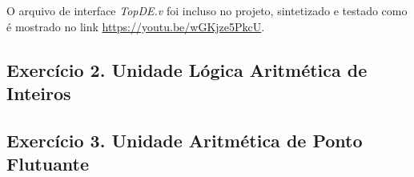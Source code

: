 \documentclass[12pt]{article}
\begin{document}
O arquivo de interface \textit{TopDE.v} foi incluso no projeto, sintetizado e testado como é mostrado no link \url{https://youtu.be/wGKjze5PkcU}.

\subsection{Exercício 2. Unidade Lógica Aritmética de Inteiros}
\label{subsec:ulaint}

\subsection{Exercício 3. Unidade Aritmética de Ponto Flutuante }
\label{subsec:ulafloat}



\end{document}
